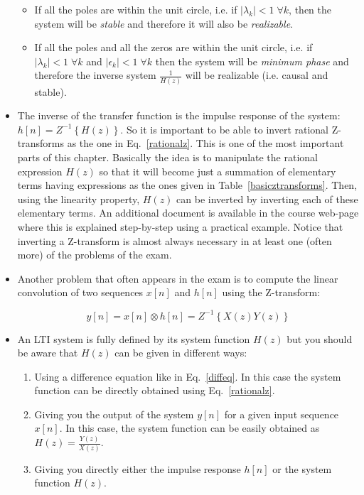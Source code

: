 \documentclass[a4paper,11pt,oneside]{article}
\begin{document}
\begin{itemize}
\begin{itemize}
\item If all the poles are within the unit circle, i.e. if $|\lambda_k|<1 \; \forall k$, then the system will be \emph{stable} and therefore it will also be \emph{realizable}. 
\item If all the poles and all the zeros are within the unit circle, i.e. if $|\lambda_k|<1 \; \forall k$ and $|\epsilon_k|<1 \; \forall k$ then the system will be \emph{minimum phase} and therefore the inverse system $\frac{1}{H(z)}$ will be realizable (i.e. causal and stable).
\end{itemize}

\item The inverse of the transfer function is the impulse response of the system: $h[n]=Z^{-1}\left\{H(z)\right\}$. So it is important to be able to invert rational Z-transforms as the one in Eq.~\ref{rationalz}. This is one of the most important parts of this chapter. Basically the idea is to manipulate the rational expression $H(z)$ so that it will become just a summation of elementary terms having expressions as the ones given in Table~\ref{basicztransforms}. Then, using the linearity property, $H(z)$ can be inverted by inverting each of these elementary terms. An additional document is available in the course web-page where this is explained step-by-step using a practical example. Notice that inverting a Z-transform is almost always necessary in at least one (often more) of the problems of the exam.

\item Another problem that often appears in the exam is to compute the linear convolution of two sequences $x[n]$ and $h[n]$ using the Z-transform:

\[
y[n]=x[n]\otimes h[n]=Z^{-1}\left\{X(z)Y(z)\right\}
\]

\item An LTI system is fully defined by its system function $H(z)$ but you should be aware that $H(z)$ can be given in different ways:

\begin{enumerate}
\item Using a difference equation like in Eq.~\ref{diffeq}. In this case the system function can be directly obtained using Eq.~\ref{rationalz}.
\item Giving you the output of the system $y[n]$ for a given input sequence $x[n]$. In this case, the system function can be easily obtained as $H(z)=\frac{Y(z)}{X(z)}$.
\item Giving you directly either the impulse response $h[n]$ or the system function $H(z)$.
\end{enumerate}








\end{itemize}
\end{document}
